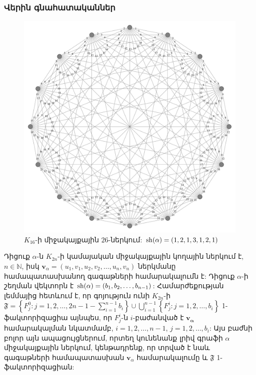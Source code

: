 \subsubsection{Վերին գնահատականներ}


\begin{figure}[t!]
\centering
\includegraphics[width=\textwidth]{figures/K_16-26.pdf}
\caption{$K_{16}$-ի միջակայքային $26$-ներկում: ${\rm sh}(\alpha) = (1,2,1,3,1,2,1)$}
\label{f2_K16}
\end{figure}



Դիցուք $\alpha$-ն $K_{2n}$-ի կամայական միջակայքային կողային ներկում է, $n \in \mathbb{N}$, իսկ $\mathbf{v}_\alpha = \left(u_1,v_1, u_2,v_2, \ldots,u_n,v_n\right)$ ներկմանը համապատասխանող գագաթների համարակալումն է: Դիցուք $\alpha$-ի շեղման վեկտորն է ${\rm sh}(\alpha) = (b_1,b_2,\ldots,b_{n-1})$: Համարժեքության լեմմայից հետևում է, որ գոյություն ունի $K_{2n}$-ի $\mathfrak{F} = 
\left\{ F^0_j : j=1,2,\ldots,2n-1-\sum\limits_{i=1}^{n-1}b_i \right\}
\cup
\bigcup\limits_{i=1}^{n-1}\left\{F^i_j : j=1,2,\ldots,b_i\right\}$ 1-ֆակտորիզացիա այնպես, որ $F^i_j$-ն $i$-բաժանված է $\mathbf{v_\alpha}$ համարակալման նկատմամբ, $i=1,2,\ldots,n-1$, $j=1,2,\ldots,b_i$: Այս բաժնի բոլոր այն ապացույցներում, որտեղ կունենանք լրիվ գրաֆի $\alpha$ միջակայքային ներկում, կենթադրենք, որ տրված է նաև գագաթների համապատասխան $\mathbf{v}_{\alpha}$ համարակալումը և $\mathfrak{F}$ 1-ֆակտորիզացիան:

